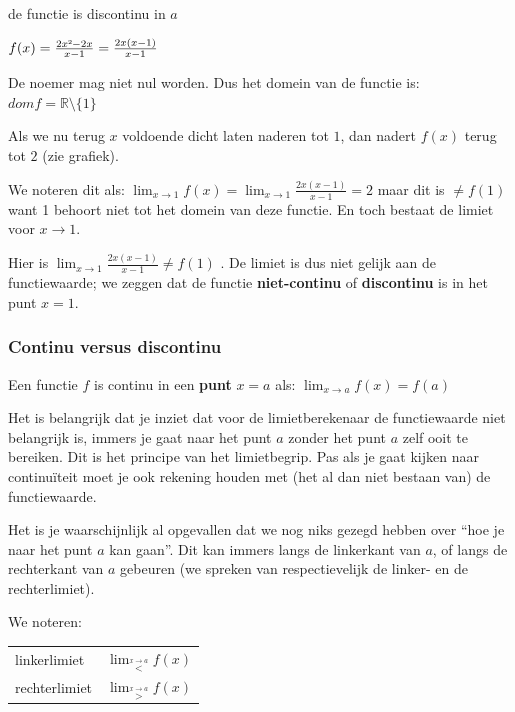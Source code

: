 \begin{voorbeeld}
de functie is discontinu in $a$

$f(x)=\frac{2x\text{\texttwosuperior}-2x}{x-1}=\frac{2x(x-1)}{x-1}$

De noemer mag niet nul worden. Dus het domein van de functie is: $domf=\mathbb{R}\setminus\{1\}$

\begin{figure}[H]
	\centering
	
\end{figure}



Als we nu terug $x$ voldoende dicht laten naderen tot $1$, dan nadert
$f(x)$ terug tot $2$ (zie grafiek).

We noteren dit als: $\lim_{x\to1}f(x)= \lim_{x\to1}\frac{2x(x-1)}{x-1}=2$
maar dit is $\neq f(1)$ want 1 behoort niet tot het domein van deze
functie. En toch bestaat de limiet voor $x\rightarrow1$.

Hier is $\lim_{x\to1}\frac{2x(x-1)}{x-1}\neq f(1)$
. De limiet is dus niet gelijk aan de functiewaarde; we zeggen dat
de functie \textbf{niet-continu} of \textbf{discontinu} is in het
punt $x=1$.

\end{voorbeeld}

\subsubsection{Continu versus discontinu}

Een functie $f$ is continu in een \textbf{punt} $x=a$ als: $\lim_{x\to a}f(x)=f(a)$

Het is belangrijk dat je inziet dat voor de limietberekenaar
de functiewaarde niet belangrijk is, immers je gaat naar het punt
$a$ zonder het punt $a$ zelf ooit te bereiken. Dit is het principe
van het limietbegrip. Pas als je gaat kijken naar continu\"iteit moet
je ook rekening houden met (het al dan niet bestaan van) de functiewaarde.


Het is je waarschijnlijk al opgevallen dat we nog niks gezegd
hebben over ``hoe je naar het punt $a$ kan gaan''. Dit kan immers
langs de linkerkant van $a$, of langs de rechterkant van $a$ gebeuren
(we spreken van respectievelijk de linker- en de rechterlimiet).


\begin{notatie}
	We noteren: %
\begin{tabular}{l|l}
linkerlimiet & $\lim_{\overset{x\rightarrow a}{<}}f(x)$\\
rechterlimiet & $\lim_{\overset{x\rightarrow a}{>}}f(x)$\\
\end{tabular}
\end{notatie}

